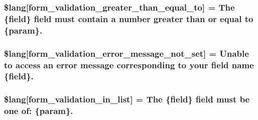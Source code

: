 \subsubsection[{\$lang}]{\setlength{\rightskip}{0pt plus 5cm}\$lang\mbox{[}\textquotesingle{}form\+\_\+validation\+\_\+greater\+\_\+than\+\_\+equal\+\_\+to\textquotesingle{}\mbox{]} = \textquotesingle{}The \{field\} field must contain {\bf a} number greater than or equal to \{param\}.\textquotesingle{}}\label{_admin_2system_2language_2english_2form__validation__lang_8php_a255dc63d9dceb22751acebc1ffc43be8}
\hypertarget{_admin_2system_2language_2english_2form__validation__lang_8php_ad29f9046f70e4b900cf5283143de0618}{}
\subsubsection[{\$lang}]{\setlength{\rightskip}{0pt plus 5cm}\$lang\mbox{[}\textquotesingle{}form\+\_\+validation\+\_\+error\+\_\+message\+\_\+not\+\_\+set\textquotesingle{}\mbox{]} = \textquotesingle{}Unable to access an error message corresponding to your field name \{field\}.\textquotesingle{}}\label{_admin_2system_2language_2english_2form__validation__lang_8php_ad29f9046f70e4b900cf5283143de0618}
\hypertarget{_admin_2system_2language_2english_2form__validation__lang_8php_ae48fb4c900d50c05f0939f9fec1262a2}{}
\subsubsection[{\$lang}]{\setlength{\rightskip}{0pt plus 5cm}\$lang\mbox{[}\textquotesingle{}form\+\_\+validation\+\_\+in\+\_\+list\textquotesingle{}\mbox{]} = \textquotesingle{}The \{field\} field must be one of\+: \{param\}.\textquotesingle{}}\label{_admin_2system_2language_2english_2form__validation__lang_8php_ae48fb4c900d50c05f0939f9fec1262a2}
